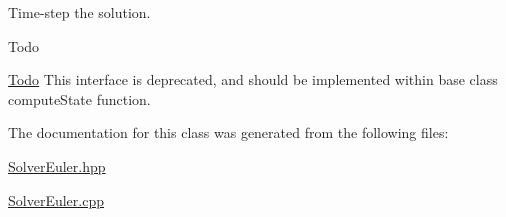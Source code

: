 Time-\/step the solution. 

\begin{DoxyRefDesc}{Todo}
\item[\mbox{\hyperlink{todo__todo000012}{Todo}}]This interface is deprecated, and should be implemented within base class\textquotesingle{} compute\+State function. \end{DoxyRefDesc}


The documentation for this class was generated from the following files\+:\begin{DoxyCompactItemize}
\item 
\mbox{\hyperlink{_solver_euler_8hpp}{Solver\+Euler.\+hpp}}\item 
\mbox{\hyperlink{_solver_euler_8cpp}{Solver\+Euler.\+cpp}}\end{DoxyCompactItemize}
